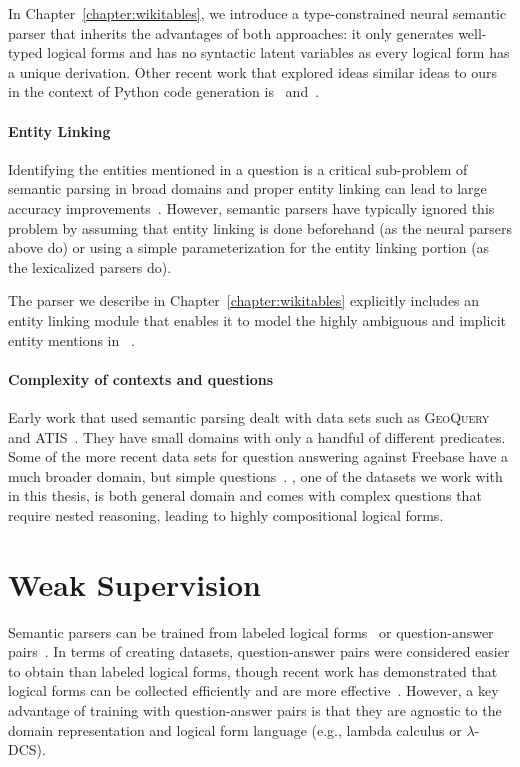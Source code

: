 In Chapter~\ref{chapter:wikitables},  we introduce a type-constrained neural
semantic parser that inherits the advantages of both
approaches: it only generates well-typed logical forms and has no syntactic
latent variables as every logical form has a unique derivation. Other recent
work that explored ideas similar ideas to ours in the context of Python code
generation is~\cite{yin17acl} and~\cite{rabinovich17acl}.

\paragraph{Entity Linking} Identifying the entities mentioned in a question is a
critical sub-problem of semantic parsing in broad domains and proper entity
linking can lead to large accuracy improvements~\cite{yih2015stagg}.  However,
semantic parsers have typically ignored this problem by assuming that entity
linking is done beforehand (as the neural parsers above do) or using a simple
parameterization for the entity linking portion (as the lexicalized parsers
do).

The parser we describe in Chapter~\ref{chapter:wikitables} explicitly includes
an entity linking module that enables it to model the highly ambiguous and
implicit entity mentions in
\WTQ~\cite{pasupat2015compositional}.

\paragraph{Complexity of contexts and questions} Early work that used
semantic parsing dealt with data
sets such as \textsc{GeoQuery}~\citep{zelle1996} and
\textsc{ATIS}~\citep{dahl1994}.
They have small domains with only a handful of different predicates.
Some of the more recent data sets for question answering against Freebase have
a much broader domain, but simple questions~\citep{berant2013,cai2013}. \WTQ,
one of the datasets we work with in this thesis, is both general domain and
comes with complex questions that require nested reasoning, leading to
highly compositional logical forms.

\section{Weak Supervision}
Semantic parsers can be trained from labeled logical forms~\citep{zelle1996,zettlemoyer05}
or question-answer pairs~\citep{liang2011learning,berant2013}.
In terms of creating datasets, question-answer
pairs were considered easier to obtain than labeled logical forms, though recent work has
demonstrated that logical forms can be collected efficiently and are more
effective~\citep{yih2016value}. However, a key advantage of training with question-answer
pairs is that they are agnostic to the domain representation and logical form
language (e.g., lambda calculus or $\lambda$-DCS).

